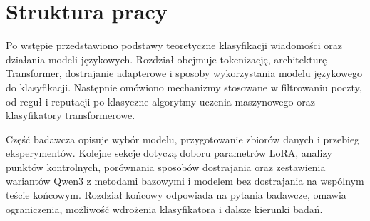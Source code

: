 \section{Struktura pracy}

Po wstępie przedstawiono podstawy teoretyczne klasyfikacji wiadomości oraz
działania modeli językowych. Rozdział obejmuje tokenizację, architekturę
Transformer, dostrajanie adapterowe i sposoby wykorzystania modelu językowego
do klasyfikacji. Następnie omówiono mechanizmy stosowane w filtrowaniu poczty,
od reguł i reputacji po klasyczne algorytmy uczenia maszynowego oraz
klasyfikatory transformerowe.

Część badawcza opisuje wybór modelu, przygotowanie zbiorów danych i
przebieg eksperymentów. Kolejne sekcje dotyczą doboru parametrów LoRA, analizy
punktów kontrolnych, porównania sposobów dostrajania oraz zestawienia
wariantów Qwen3 z metodami bazowymi i modelem bez dostrajania na wspólnym
teście końcowym. Rozdział końcowy odpowiada na pytania badawcze, omawia
ograniczenia, możliwość wdrożenia klasyfikatora i dalsze kierunki badań.
